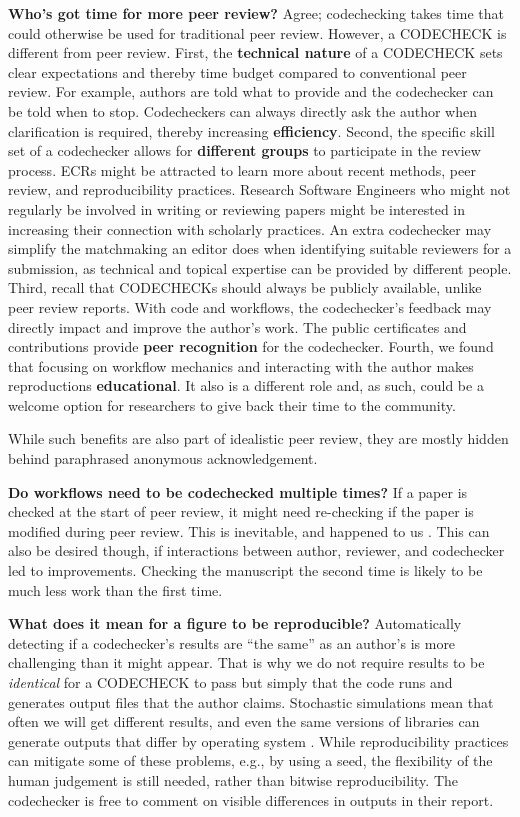 \documentclass[12pt]{article}
\begin{document}
\textbf{Who's got time for more peer review?} Agree; codechecking
takes time that could otherwise be used for traditional peer review.
However, a CODECHECK is different from peer review.  First, the
\textbf{technical nature} of a CODECHECK sets clear expectations and
thereby time budget compared to conventional peer review.  For
example, authors are told what to provide and the codechecker can be
told when to stop.  Codecheckers can always directly ask the author
when clarification is required, thereby increasing
\textbf{efficiency}.  Second, the specific skill set of a codechecker
allows for \textbf{different groups} to participate in the review
process.  ECRs might be attracted to learn more about recent methods,
peer review, and reproducibility practices.  Research Software
Engineers  %
who might not regularly be involved in writing or reviewing papers
might be interested in increasing their connection with scholarly
practices.  An extra codechecker may simplify the matchmaking an
editor does when identifying suitable reviewers for a submission,
as technical and topical expertise can be provided by different
people.  Third, recall that CODECHECKs should always be publicly
available, unlike peer review reports.  With code and workflows, the
codechecker's feedback may directly impact and improve the author's
work.  The public certificates and contributions provide \textbf{peer
  recognition} for the codechecker.  Fourth, we found that focusing on
workflow mechanics and interacting with the author makes reproductions
\textbf{educational}. It also is a different role and, as such, could
be a welcome option for researchers to give back their time to the
community.

While such benefits are also part of idealistic peer review, they are
mostly hidden behind paraphrased anonymous acknowledgement.

\textbf{Do workflows need to be codechecked multiple times?}  If a
paper is checked at the start of peer review, it might need
re-checking if the paper is modified during peer review.  This is
inevitable, and happened to us \cite{cert-2020-012}. This can
also be desired though, if interactions between author, reviewer,
and codechecker led to improvements.  Checking the manuscript the
second time is likely to be much less work than the first time.

\textbf{What does it mean for a figure to be reproducible?}
Automatically detecting if a codechecker's results are ``the same'' as
an author's is more challenging than it might appear.  That is why we
do not require results to be \textit{identical} for a CODECHECK to
pass but simply that the code runs and generates output files that the
author claims. Stochastic simulations mean that often we will get
different results, and even the same versions of libraries can
generate outputs that differ by operating system
\cite{Gronenschild2012-pp}.  While reproducibility practices can
mitigate some of these problems, e.g., by using a seed, the
flexibility of the human judgement is still needed, rather than
bitwise reproducibility.  The codechecker is free to comment on
visible differences in outputs in their report.
\end{document}
